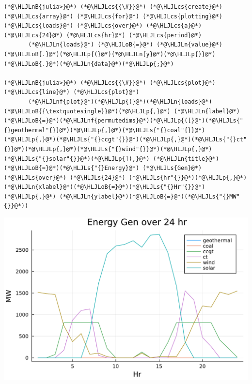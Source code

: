 \documentclass[12pt,a4paper]{article}
\newcommand{\HLJLn}[1]{#1}
\newcommand{\HLJLnf}[1]{\textcolor[RGB]{66,102,213}{#1}}
\newcommand{\HLJLs}[1]{\textcolor[RGB]{201,61,57}{#1}}
\newcommand{\HLJLnB}[1]{\textcolor[RGB]{59,151,46}{#1}}
\newcommand{\HLJLoB}[1]{\textcolor[RGB]{102,102,102}{\textbf{#1}}}
\newcommand{\HLJLp}[1]{#1}
\newcommand{\HLJLcs}[1]{\textcolor[RGB]{153,153,119}{\textit{#1}}}
\begin{document}
\begin{lstlisting}
(*@\HLJLnB{julia>}@*) (*@\HLJLcs{{\#}}@*) (*@\HLJLcs{create}@*) (*@\HLJLcs{array}@*) (*@\HLJLcs{for}@*) (*@\HLJLcs{plotting}@*) (*@\HLJLcs{loads}@*) (*@\HLJLcs{over}@*) (*@\HLJLcs{a}@*) (*@\HLJLcs{24}@*) (*@\HLJLcs{hr}@*) (*@\HLJLcs{period}@*)
       (*@\HLJLn{loads}@*) (*@\HLJLoB{=}@*) (*@\HLJLn{value}@*)(*@\HLJLoB{.}@*)(*@\HLJLp{(}@*)(*@\HLJLn{y}@*)(*@\HLJLp{)}@*)(*@\HLJLoB{.}@*)(*@\HLJLn{data}@*)(*@\HLJLp{;}@*)

(*@\HLJLnB{julia>}@*) (*@\HLJLcs{{\#}}@*) (*@\HLJLcs{plot}@*) (*@\HLJLcs{line}@*) (*@\HLJLcs{plot}@*)
       (*@\HLJLnf{plot}@*)(*@\HLJLp{(}@*)(*@\HLJLn{loads}@*)(*@\HLJLoB{{\textquotesingle}}@*)(*@\HLJLp{,}@*) (*@\HLJLn{label}@*)(*@\HLJLoB{=}@*)(*@\HLJLnf{permutedims}@*)(*@\HLJLp{([}@*)(*@\HLJLs{"{}geothermal"{}}@*)(*@\HLJLp{,}@*)(*@\HLJLs{"{}coal"{}}@*)(*@\HLJLp{,}@*)(*@\HLJLs{"{}ccgt"{}}@*)(*@\HLJLp{,}@*)(*@\HLJLs{"{}ct"{}}@*)(*@\HLJLp{,}@*)(*@\HLJLs{"{}wind"{}}@*)(*@\HLJLp{,}@*)(*@\HLJLs{"{}solar"{}}@*)(*@\HLJLp{]),}@*) (*@\HLJLn{title}@*)(*@\HLJLoB{=}@*)(*@\HLJLs{"{}Energy}@*) (*@\HLJLs{Gen}@*) (*@\HLJLs{over}@*) (*@\HLJLs{24}@*) (*@\HLJLs{hr"{}}@*)(*@\HLJLp{,}@*) (*@\HLJLn{xlabel}@*)(*@\HLJLoB{=}@*)(*@\HLJLs{"{}Hr"{}}@*)(*@\HLJLp{,}@*) (*@\HLJLn{ylabel}@*)(*@\HLJLoB{=}@*)(*@\HLJLs{"{}MW"{}}@*))
\end{lstlisting}
\includegraphics[width=\linewidth]{figures/solution-template_10_1.pdf}
\end{document}
